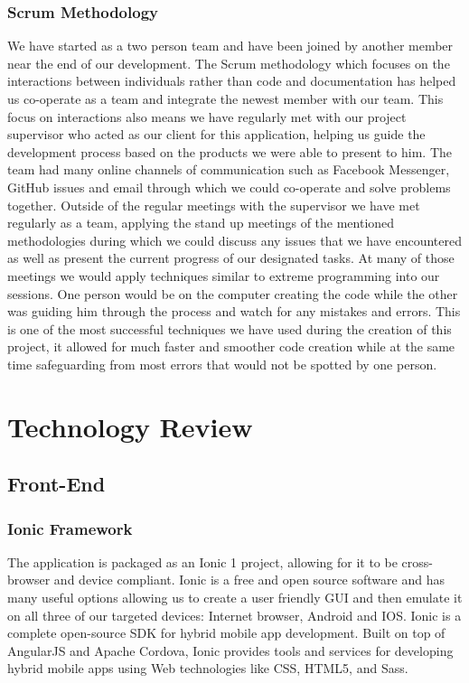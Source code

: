   \subsection{Scrum Methodology}
  We have started as a two person team and have been joined by another member near the end of our development. The Scrum methodology which focuses on the interactions between
  individuals rather than code and documentation has helped us co-operate as a team and integrate the newest member with our team.
  This focus on interactions also means we have regularly met with our project supervisor who acted as our client for this application, helping us guide the
  development process based on the products we were able to present to him.
  The team had many online channels of communication such as Facebook Messenger, GitHub issues and email through which we could co-operate and solve problems together.
  Outside of the regular meetings with the supervisor we have met regularly as a team, applying the stand up meetings of the mentioned methodologies during which
  we could discuss any issues that we have encountered as well as present the current progress of our designated tasks.
  At many of those meetings we would apply techniques similar to extreme programming into our sessions\cite{scrum}.
  One person would be on the computer creating the code while the other was guiding him through the process and watch for any mistakes and errors.
  This is one of the most successful techniques we have used during the creation of this project, it allowed for much faster and smoother code creation while
  at the same time safeguarding from most errors that would not be spotted by one person.


\chapter{Technology Review}

\section{Front-End}
\subsection{Ionic Framework}
The application is packaged as an Ionic 1 project, allowing for it to be cross-browser and device compliant. Ionic is a free and open source software and has many useful options allowing us to create a user friendly GUI and then emulate it on all three of our targeted devices: Internet browser, Android and IOS. Ionic is a complete open-source SDK for hybrid mobile app development.\cite{ionic} Built on top of AngularJS and Apache Cordova, Ionic provides tools and services for developing hybrid mobile apps using Web technologies like CSS, HTML5, and Sass.\cite{ionic}

